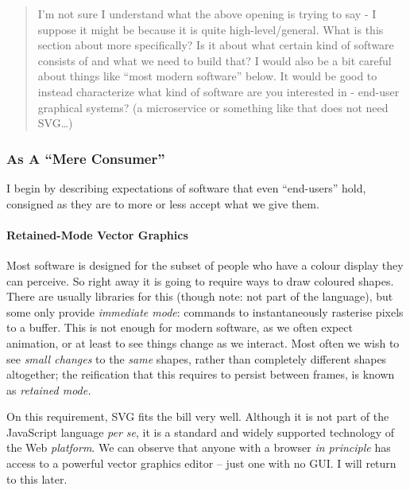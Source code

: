 \documentclass[english,submission]{programming}
\begin{document}
\begin{quote}
I'm not sure I understand what the above opening is trying to say - I
suppose it might be because it is quite high-level/general. What is this
section about more specifically? Is it about what certain kind of
software consists of and what we need to build that? I would also be a
bit careful about things like ``most modern software'' below. It would
be good to instead characterize what kind of software are you interested
in - end-user graphical systems? (a microservice or something like that
does not need SVG\ldots{})
\end{quote}

\hypertarget{as-a-mere-consumer}{%
\subsubsection{As A ``Mere Consumer''}\label{as-a-mere-consumer}}

I begin by describing expectations of software that even ``end-users''
hold, consigned as they are to more or less accept what we give them.

\hypertarget{retained-mode-vector-graphics}{%
\paragraph{Retained-Mode Vector
Graphics}\label{retained-mode-vector-graphics}}

Most software is designed for the subset of people who have a colour
display they can perceive. So right away it is going to require ways to
draw coloured shapes. There are usually libraries for this (though note:
not part of the language), but some only provide \emph{immediate mode}:
commands to instantaneously rasterise pixels to a buffer. This is not
enough for modern software, as we often expect animation, or at least to
see things change as we interact. Most often we wish to see \emph{small
changes} to the \emph{same} shapes, rather than completely different
shapes altogether; the reification that this requires to persist between
frames, is known as \emph{retained mode.}

On this requirement, SVG fits the bill very well. Although it is not
part of the JavaScript language \emph{per se}, it is a standard and
widely supported technology of the Web \emph{platform}. We can observe
that anyone with a browser \emph{in principle} has access to a powerful
vector graphics editor -- just one with no GUI. I will return to this
later.
\end{document}
